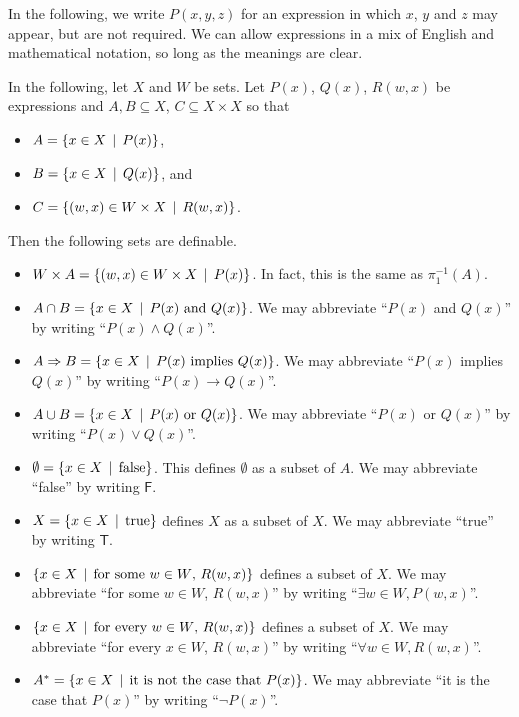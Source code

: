 In the following, we write $P(x,y,z)$ for an expression in which $x$, $y$ and $z$ may appear, but are not required. 
We can allow expressions in a mix of English and mathematical notation, so long as the meanings are clear.

\begin{vocabulary}
	In the following, let $X$ and $W$ be sets. Let $P(x)$, $Q(x)$, $R(w,x)$ be expressions and $A,B\subseteq X$, $C\subseteq X\times X$ so that
	\begin{itemize}
		\item $A = \{x\in X\,\mid\, P(x)\}$,
		\item $B = \{x\in X\,\mid\, Q(x)\}$, and
		\item $C = \{(w,x)\in W\times X\,\mid\, R(w,x)\}$.
	\end{itemize}
Then the following sets are definable. 
\begin{itemize}
\item $W\times A = \{(w,x)\in W\times X\,\mid\, P(x)\}$. In fact, this is the same 
as $\pi_1^{-1}(A)$.  

\item $A\cap B = \{x\in X\,\mid\, \text{$P(x)$ and $Q(x)$}\}$. We may abbreviate ``$P(x)$ and $Q(x)$'' by writing ``$P(x)\wedge Q(x)$''. 

\item $A\Rightarrow B = \{x\in X\,\mid\, \text{$P(x)$ implies $Q(x)$}\}$. We may abbreviate ``$P(x)$ implies $Q(x)$'' by writing ``$P(x)\to Q(x)$''.

\item $A\cup B = \{x\in X\,\mid\, \text{$P(x)$ or $Q(x)$}\}$. We may abbreviate ``$P(x)$ or $Q(x)$'' by writing ``$P(x)\vee Q(x)$''.
	
\item $\emptyset = \{x\in X\,\mid\, \text{false} \}$. This defines $\emptyset$ as a subset of $A$. We may abbreviate ``false'' by writing $\textsf{F}$.
	
\item $X = \{x\in X\,\mid\, \text{true}\}$ defines $X$ as a subset of $X$. We may abbreviate ``true'' by writing $\textsf{T}$.
	
\item $\{x\in X \,\mid\, \text{for some $w\in W$, $R(w,x)$}\}$ defines a subset of $X$. We may abbreviate ``for some $w\in W$, $R(w,x)$'' by writing ``$\exists w\in W, P(w,x)$''.
	
\item $\{x\in X \,\mid\, \text{for every $w\in W$, $R(w,x)$}\}$ defines a subset of $X$.  We may abbreviate ``for every $x\in W$, $R(w,x)$'' by writing ``$\forall w\in W, R(w,x)$''.

\item $A^* = \{x\in X\,\mid\, \text{it is not the case that $P(x)$}\}$.  We may abbreviate ``it is the case that $P(x)$'' by writing ``$\neg P(x)$''.
\end{itemize}
\end{vocabulary}

